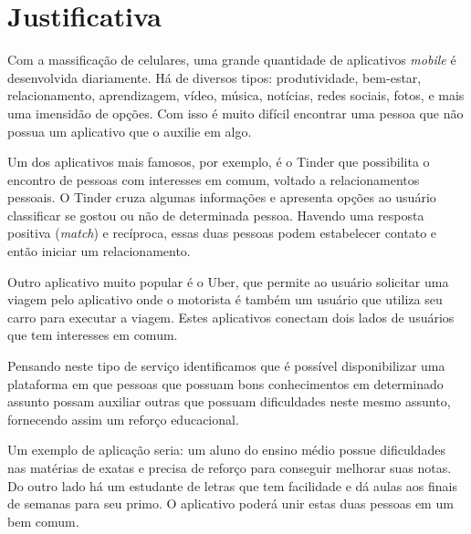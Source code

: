 \chapter[Justificativa]{Justificativa}

Com a massificação de celulares, uma grande quantidade de aplicativos \emph{mobile} é desenvolvida diariamente. Há de diversos tipos: produtividade, bem-estar, relacionamento, aprendizagem, vídeo, música, notícias, redes sociais, fotos, e mais uma imensidão de opções. 
Com isso é muito difícil encontrar uma pessoa que não possua um aplicativo que o auxilie em algo. 

Um dos aplicativos mais famosos, por exemplo, é o Tinder que possibilita o encontro de pessoas com interesses em comum, voltado a relacionamentos pessoais. O Tinder cruza algumas informações e apresenta opções ao usuário classificar se gostou ou não de determinada pessoa. Havendo uma resposta positiva (\emph{match}) e recíproca, essas duas pessoas podem estabelecer contato e então iniciar um relacionamento.

Outro aplicativo muito popular é o Uber, que permite ao usuário solicitar uma viagem pelo aplicativo onde o motorista é também um usuário que utiliza seu carro para executar a viagem. Estes aplicativos conectam dois lados de usuários que tem interesses em comum.

Pensando neste tipo de serviço identificamos que é possível disponibilizar uma plataforma em que pessoas que possuam bons conhecimentos em determinado assunto possam auxiliar outras que possuam dificuldades neste mesmo assunto, fornecendo assim um reforço educacional. 

Um exemplo de aplicação seria: um aluno do ensino médio possue dificuldades nas matérias de exatas e precisa de reforço para conseguir melhorar suas notas. Do outro lado há um estudante de letras que tem facilidade e dá aulas aos finais de semanas para seu primo. O aplicativo poderá unir estas duas pessoas em um bem comum.

